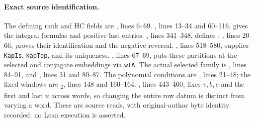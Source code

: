 \paragraph{Exact source identification.}
The defining rank and HC fields are
, lines 6--69.
, lines 13--34 and 60--116, gives the integral
formulas and positive last entries.
, lines 341--348, defines
;
,
lines 20--66, proves their identification and the negative reversal.
, lines 518--580, supplies
\texttt{KapIs}, \texttt{kapTop}, and its uniqueness.
, lines 67--69,
puts these partitions at the selected and conjugate embeddings via
\texttt{wtA}. The actual selected family is
, lines 84--91, and
, lines 31 and 80--87.
The polynomial conditions are , lines 21--48;
the fixed windows are \textsubscript{2}, lines 148 and 160--164.
, lines 443--460, fixes
$v,b,e$ and the first and last $u$ across words, so changing the entire
row datum is distinct from varying a word.
These are source reads, with original-author byte identity recorded;
no Lean execution is asserted.
